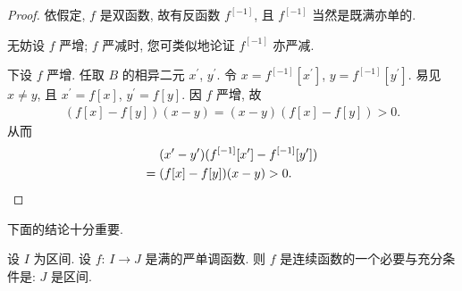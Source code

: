 \begin{proof}
    依假定, $f$ 是双函数, 故有反函数 $f^{[-1]}$, 且 $f^{[-1]}$ 当然是既满亦单的.

    无妨设 $f$ 严增; $f$ 严减时, 您可类似地论证 $f^{[-1]}$ 亦严减.

    下设 $f$ 严增. 任取 $B$ 的相异二元 $x^{\prime}$, $y^{\prime}$. 令 $x = f^{[-1]} [x^{\prime}]$, $y = f^{[-1]} [y^{\prime}]$. 易见 $x \neq y$, 且 $x^{\prime} = f[x]$, $y^{\prime} = f[y]$. 因 $f$ 严增, 故
    \begin{align*}
        (f[x] - f[y])(x - y) = (x - y)(f[x] - f[y]) > 0.
    \end{align*}
    从而
    \begin{align*}
             & (x^{\prime} - y^{\prime})(f^{[-1]} [x^{\prime}] - f^{[-1]} [y^{\prime}]) \\
        = {} & (f[x] - f[y])(x - y) > 0. \qedhere
    \end{align*}
\end{proof}

下面的结论十分重要.

\begin{theorem}
    设 $I$ 为区间. 设 $f$: $I \to J$ 是满的严单调函数. 则 $f$ 是连续函数的一个必要与充分条件是: $J$ 是区间.
\end{theorem}

